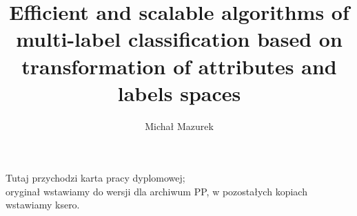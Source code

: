 \documentclass[english,a4paper,oneside]{ppfcmthesis}
\author{Michał Mazurek}
\title{Efficient and scalable algorithms of multi-label classification based on transformation of attributes and labels spaces}
\begin{document}
\frontmatter\pagestyle{empty}%
\maketitle\cleardoublepage%

\thispagestyle{empty}\vspace*{\fill}%
\begin{center}Tutaj przychodzi karta pracy dyplomowej;\\oryginał wstawiamy do wersji dla archiwum PP, w pozostałych kopiach wstawiamy ksero.\end{center}%
\vfill\cleardoublepage%

\pagestyle{ppfcmthesis}%





\tableofcontents* \cleardoublepage%

\cleardoublepage
\listoffigures

\cleardoublepage
\listoftables


\mainmatter%






\cleardoublepage


{\raggedright\sloppy\small}

\ppcolophon
\end{document}
